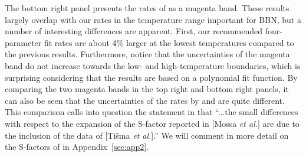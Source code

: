 \documentclass[twocolumn]{aastex63}
\begin{document}
The bottom right panel presents the rates of \citet{Pis21} as a magenta band. These results largely overlap with our rates in the temperature range important for BBN, but a number of interesting differences are apparent. First, our recommended four-parameter fit rates are about 4\% larger at the lowest temperatures compared to the previous results. Furthermore, notice that the uncertainties of the magenta band do not increase towards the low- and high-temperature boundaries, which is surprising considering that the results are based on a polynomial fit function. By comparing the two magenta bands in the top right and bottom right panels, it can also be seen that the uncertainties of the rates by \citet{Mossa20} and \citet{Pis21} are quite different. This comparison calls into question the statement in \citet{Pis21} that ``...the small differences with respect to the expansion of the S-factor reported in [Mossa {\it et al.}] are due to the inclusion of the data of [Ti{\v s}ma {\it et al.}].'' We will comment in more detail on the S-factors of \citet{Mossa20,Pis21} in Appendix~\ref{sec:app2}.

\end{document}
